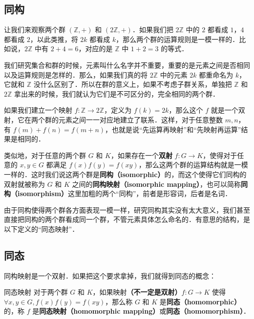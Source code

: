 

\subsection{同构}

让我们来观察两个群 $(\mathbb{Z}, +)$ 和 $(2\mathbb{Z},+)$．如果我们把 $2\mathbb{Z}$ 中的 $2$ 都看成 $1$，$4$ 都看成 $2$，以此类推，将 $2k$ 都看成 $k$，那么两个群的运算规则是一模一样的．比如说，$2\mathbb{Z}$ 中有 $2+4=6$，对应的是 $\mathbb{Z}$ 中 $1+2=3$ 的等式．

我们研究集合和群的时候，元素叫什么名字并不重要，重要的是元素之间是否相同以及运算规则是怎样的．那么，如果我们真的将 $2\mathbb{Z}$ 中的元素 $2k$ 都重命名为 $k$，它就和 $\mathbb{Z}$ 没什么区别了．所以在群的意义上，如果不考虑子群关系，单独把 $\mathbb{Z}$ 和 $2\mathbb{Z}$ 拿出来的时候，我们就认为它们是不可区分的，完全相同的两个群．

如果我们建立一个映射 $f:\mathbb{Z}\rightarrow2\mathbb{Z}$，定义为 $f(k)=2k$，那么这个 $f$ 就是一个双射，它在两个群的元素之间一一对应地建立了联系．这样，对于任意整数 $m, n$，有 $f(m)+f(n)=f(m+n)$，也就是说“先运算再映射”和“先映射再运算”结果是相同的．

类似地，对于任意的两个群 $G$ 和 $K$，如果存在一个\textbf{双射} $f:G\rightarrow K$，使得对于任意的 $x, y\in G$ 都满足 $f(x)f(y)=f(xy)$，那么这两个群的运算结构就是一模一样的．这时我们说这两个群是\textbf{同构（isomorphic）}的，而这个使得它们同构的双射就被称为 $G$ 和 $K$ 之间的\textbf{同构映射（isomorphic mapping）}，也可以简称\textbf{同构（isomorphism）}这里加粗的两个“同构”，前者是形容词，后者是名词．

由于同构使得两个群各方面表现一模一样，研究同构其实没有太大意义，我们甚至直接把同构的两个群看成同一个群，不管元素具体怎么命名的．有意思的结构，是以下定义的“同态映射”．

\subsection{同态}

同构映射是一个双射．如果把这个要求拿掉，我们就得到同态的概念：

\begin{definition}{同态映射}\label{Group2_def1}
对于两个群 $G$ 和 $K$，如果映射\textbf{（不一定是双射）}$f:G\rightarrow K$ 使得 $\forall x, y\in G, f(x)f(y)=f(xy)$，那么称 $G$ 和 $K$ 是\textbf{同态（homomorphic）}的，称 $f$ 是\textbf{同态映射（homomorphic mapping）}或\textbf{同态（homomorphism）}．
\end{definition}

